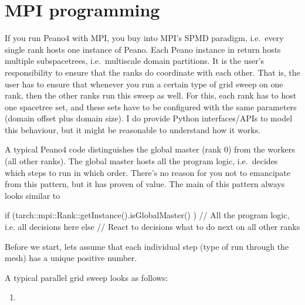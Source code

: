 \chapter{MPI programming}
\label{section:mpi}

If you run Peano4 with MPI, you buy into MPI's SPMD paradigm, i.e.~every single
rank hosts one instance of Peano.
Each Peano instance in return hosts multiple subspacetrees, i.e.~multiscale
domain partitions.
It is the user's responsibility to ensure that the ranks do coordinate with each
other.
That is, the user has to ensure that whenever you run a certain type of grid
sweep on one rank, then the other ranks run this sweep as well.
For this, each rank has to host one spacetree set, and these sets have to be
configured with the same parameters (domain offset plus domain size).
I do provide Python interfaces/APIs to model this behaviour, but it might be
reasonable to understand how it works.



A typical Peano4 code distinguishes the global master (rank 0) from the workers
(all other ranks).
The global master hosts all the program logic, i.e.~decides which steps to run
in which order.
There's no reason for you not to emancipate from this pattern, but it has proven
of value.
The main of this pattern always looks similar to 
\begin{code}
  if (tarch::mpi::Rank::getInstance().isGlobalMaster() ) {
    // All the program logic, i.e. all decisions here
  }
  else {
    // React to decisions what to do next on all other ranks
  }
\end{code}


Before we start, lets assume that each individual step (type of run through the
mesh) has a unique positive number. 

A typical parallel grid sweep looks as follows:
\begin{enumerate}
  \item 
\end{enumerate} 


